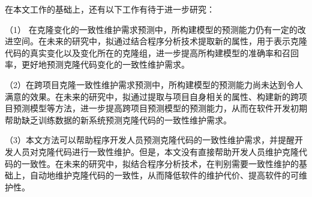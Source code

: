 在本文工作的基础上，还有以下工作有待于进一步研究：

（1） 在克隆变化的一致性维护需求预测中，所构建模型的预测能力仍有一定的改进空间。在未来的研究中，拟通过结合程序分析技术提取新的属性，用于表示克隆代码的真实变化以及变化所在的克隆组，进一步提高所构建模型的准确率和召回率，更好地预测克隆代码变化的一致性维护需求。

（2）在跨项目克隆一致性维护需求预测中，所构建模型的预测能力尚未达到令人满意的效果。在未来的研究中，拟通过提取与项目自身相关的属性、构建新的跨项目预测模型等方法，进一步提高跨项目预测模型的预测能力，从而在软件开发初期帮助缺乏训练数据的新系统预测克隆代码的一致性维护需求。

（3）本文方法可以帮助程序开发人员预测克隆代码的一致性维护需求，并提醒开发人员对克隆代码进行一致性维护。但是，本文没有直接帮助开发人员维护克隆代码的一致性。在未来的研究中，拟结合程序分析技术，在判别需要一致性维护的基础上，自动地维护克隆代码的一致性，从而降低软件的维护代价、提高软件的可维护性。